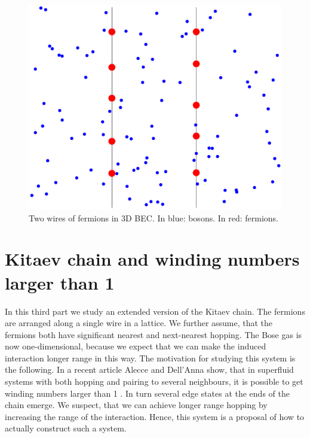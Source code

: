 \documentclass[11pt, twoside]{Thesis}
\begin{document}
\vspace{2.5cm}

\begin{figure}[H]
\center
\includegraphics[width=0.8\columnwidth]{gasandwires2D.eps}
\\ Two wires of fermions in 3D BEC. In blue: bosons. In red: fermions.  
\end{figure}

\newpage


 
 
 

\part{Kitaev chain and winding numbers larger than 1}
In this third part we study an extended version of the Kitaev chain. The fermions are arranged along a single wire in a lattice. We further assume, that the fermions both have significant nearest and next-nearest hopping. The Bose gas is now one-dimensional, because we expect that we can make the induced interaction longer range in this way. The motivation for studying this system is the following. In a recent article Alecce and Dell'Anna show, that in superfluid systems with both hopping and pairing to several neighbours, it is possible to get winding numbers larger than 1 \cite{Alecce.extendKitaev}. In turn several edge states at the ends of the chain emerge. We suspect, that we can achieve longer range hopping by increasing the range of the interaction. Hence, this system is a proposal of how to actually construct such a system. 

\vspace{2.5cm}
\end{document}
